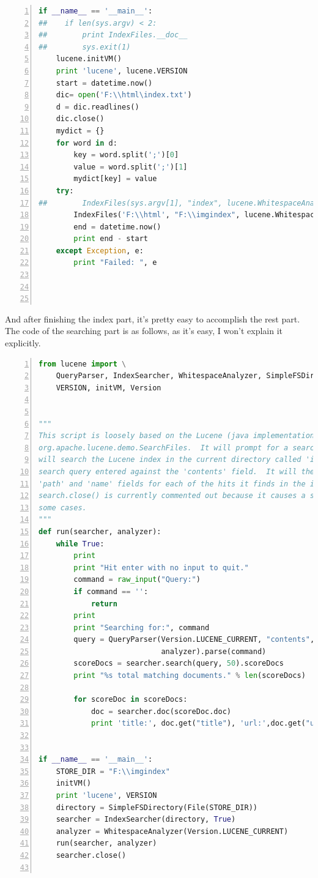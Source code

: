 \documentclass{article}
\begin{document}
\begin{lstlisting}[language=python,numbers=left,frame=leftline]
if __name__ == '__main__':
##    if len(sys.argv) < 2:
##        print IndexFiles.__doc__
##        sys.exit(1)
    lucene.initVM()
    print 'lucene', lucene.VERSION
    start = datetime.now()
    dic= open('F:\\html\index.txt')
    d = dic.readlines()
    dic.close()
    mydict = {}
    for word in d:
        key = word.split(';')[0]
        value = word.split(';')[1]
        mydict[key] = value
    try:
##        IndexFiles(sys.argv[1], "index", lucene.WhitespaceAnalyzer(lucene.Version.LUCENE_CURRENT))
        IndexFiles('F:\\html', "F:\\imgindex", lucene.WhitespaceAnalyzer(lucene.Version.LUCENE_CURRENT))
        end = datetime.now()
        print end - start
    except Exception, e:
        print "Failed: ", e




\end{lstlisting}
And after finishing the index part, it's pretty easy to accomplish the rest part. The code of the searching part is as follows, as it's easy, I won't explain it explicitly.\\
\begin{lstlisting}[language=python,numbers=left,frame=leftline]
from lucene import \
    QueryParser, IndexSearcher, WhitespaceAnalyzer, SimpleFSDirectory, File, \
    VERSION, initVM, Version


"""
This script is loosely based on the Lucene (java implementation) demo class
org.apache.lucene.demo.SearchFiles.  It will prompt for a search query, then it
will search the Lucene index in the current directory called 'index' for the
search query entered against the 'contents' field.  It will then display the
'path' and 'name' fields for each of the hits it finds in the index.  Note that
search.close() is currently commented out because it causes a stack overflow in
some cases.
"""
def run(searcher, analyzer):
    while True:
        print
        print "Hit enter with no input to quit."
        command = raw_input("Query:")
        if command == '':
            return
        print
        print "Searching for:", command
        query = QueryParser(Version.LUCENE_CURRENT, "contents",
                            analyzer).parse(command)
        scoreDocs = searcher.search(query, 50).scoreDocs
        print "%s total matching documents." % len(scoreDocs)

        for scoreDoc in scoreDocs:
            doc = searcher.doc(scoreDoc.doc)
            print 'title:', doc.get("title"), 'url:',doc.get("url"), 'imgurl:', doc.get("imgurl")


if __name__ == '__main__':
    STORE_DIR = "F:\\imgindex"
    initVM()
    print 'lucene', VERSION
    directory = SimpleFSDirectory(File(STORE_DIR))
    searcher = IndexSearcher(directory, True)
    analyzer = WhitespaceAnalyzer(Version.LUCENE_CURRENT)
    run(searcher, analyzer)
    searcher.close()


\end{lstlisting}
\end{document}

